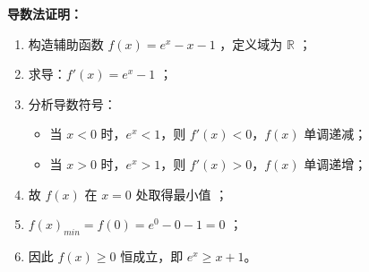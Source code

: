 \begin{proofbox}
\textbf{导数法证明：}
\begin{enumerate}
    \item 构造辅助函数 $f(x) = e^x - x - 1$ ，定义域为 $\mathbb{R}$ ；
    \item 求导：$f'(x) = e^x - 1$ ；
    \item 分析导数符号：
    \begin{itemize}
        \item 当 $x < 0$ 时，$e^x < 1$，则 $f'(x) < 0$，$f(x)$ 单调递减；
        \item 当 $x > 0$ 时，$e^x > 1$，则 $f'(x) > 0$，$f(x)$ 单调递增；
    \end{itemize}
    \item 故 $f(x)$ 在 $x = 0$ 处取得最小值 ；
    \item $f(x)_{min} = f(0) = e^0 - 0 - 1 = 0$ ；
    \item 因此 $f(x) \geqslant 0$ 恒成立，即 $e^x \geqslant x + 1$。
\end{enumerate}
\end{proofbox}